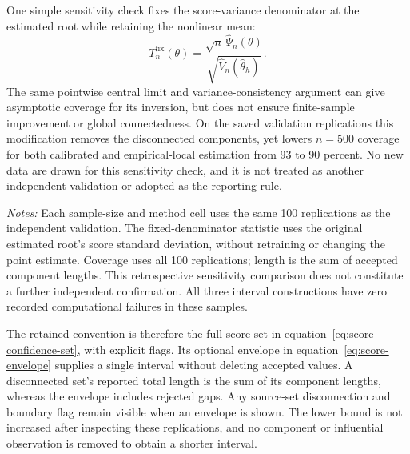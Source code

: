 One simple sensitivity check fixes the score-variance denominator at the
estimated root while retaining the nonlinear mean:
\[
T_n^{\mathrm{fix}}(\theta)
=\frac{\sqrt n\,\widehat\Psi_n(\theta)}
{\sqrt{\widehat V_n(\widehat\theta_h)}}.
\]
The same pointwise central limit and variance-consistency argument can give
asymptotic coverage for its inversion, but does not ensure finite-sample
improvement or global connectedness. On the saved validation replications
this modification removes the disconnected components, yet lowers
$n=500$ coverage for both calibrated and empirical-local estimation from
93 to 90 percent. No new data are drawn for this sensitivity check, and it
is not treated as another independent validation or adopted as the reporting
rule.

\begin{table}[htbp]
\centering
\small
\caption{Fixed-denominator sensitivity on the saved validation samples}
\label{tab:score-set-sensitivity}
\resizebox{\textwidth}{!}{}
\begin{minipage}{0.96\textwidth}
\footnotesize
\emph{Notes:} Each sample-size and method cell uses the same 100 replications
as the independent validation. The fixed-denominator statistic uses the
original estimated root's score standard deviation, without retraining or
changing the point estimate. Coverage uses all 100 replications; length is the
sum of accepted component lengths. This retrospective sensitivity comparison
does not constitute a further independent confirmation. All three interval
constructions have zero recorded computational failures in these samples.
\end{minipage}
\end{table}

The retained convention is therefore the full score set in
equation~\eqref{eq:score-confidence-set}, with explicit flags. Its optional
envelope in equation~\eqref{eq:score-envelope} supplies a single interval
without deleting accepted values. A disconnected set's reported total length
is the sum of its component lengths, whereas the envelope includes rejected
gaps. Any source-set disconnection and boundary flag remain visible when an
envelope is shown. The lower bound is not increased after inspecting these
replications, and no component or influential observation is removed to
obtain a shorter interval.
